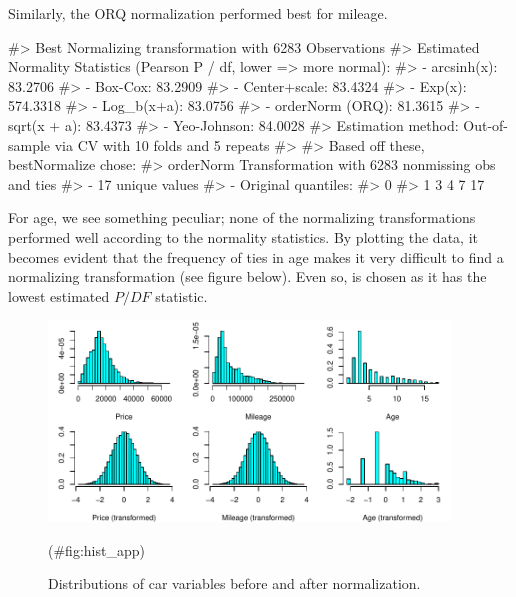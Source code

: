 Similarly, the ORQ normalization performed best for mileage.

\begin{Schunk}

\begin{Soutput}
#> Best Normalizing transformation with 6283 Observations
#>  Estimated Normality Statistics (Pearson P / df, lower => more normal):
#>  - arcsinh(x): 83.2706
#>  - Box-Cox: 83.2909
#>  - Center+scale: 83.4324
#>  - Exp(x): 574.3318
#>  - Log_b(x+a): 83.0756
#>  - orderNorm (ORQ): 81.3615
#>  - sqrt(x + a): 83.4373
#>  - Yeo-Johnson: 84.0028
#> Estimation method: Out-of-sample via CV with 10 folds and 5 repeats
#>  
#> Based off these, bestNormalize chose:
#> orderNorm Transformation with 6283 nonmissing obs and ties
#>  - 17 unique values 
#>  - Original quantiles:
#>   0%
#>    1    3    4    7   17
\end{Soutput}
\end{Schunk}

For age, we see something peculiar; none of the normalizing
transformations performed well according to the normality statistics. By
plotting the data, it becomes evident that the frequency of ties in age
makes it very difficult to find a normalizing transformation (see figure
below). Even so,  is chosen as it has the lowest
estimated \(P/DF\) statistic.

\begin{Schunk}
\begin{figure}

{\centering \includegraphics[width=4.2in,height=2.1in]{figs/hist_app-1} 

}

\caption[Distributions of car variables before and after normalization]{Distributions of car variables before and after normalization.}(\#fig:hist_app)
\end{figure}
\end{Schunk}

